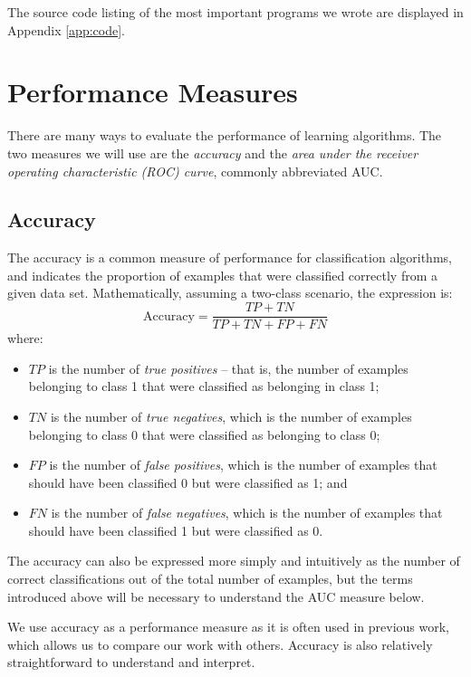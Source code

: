 The source code listing of the most important programs we wrote are displayed
in Appendix \ref{app:code}.

\section{Performance Measures}
There are many ways to evaluate the performance of learning algorithms. The
two measures we will use are the \textit{accuracy} and the \textit{area under
the receiver operating characteristic (ROC) curve}, commonly abbreviated AUC.

\subsection{Accuracy}
The accuracy is a common measure of performance for classification algorithms,
and indicates the proportion of examples that were classified correctly from
a given data set. Mathematically, assuming a two-class scenario, the expression
is:
\begin{equation*}
\mathrm{Accuracy} = \dfrac{TP + TN}{TP + TN + FP + FN}
\end{equation*}
where:
\begin{itemize}
  \item $TP$ is the number of \textit{true positives} -- that is, the number of
  examples belonging to class 1 that were classified as belonging in class 1;
  \item $TN$ is the number of \textit{true negatives}, which is the number of
  examples belonging to class 0 that were classified as belonging to class 0;
  \item $FP$ is the number of \textit{false positives}, which is the number of
  examples that should have been classified 0 but were classified as 1; and
  \item $FN$ is the number of \textit{false negatives}, which is the number of
  examples that should have been classified 1 but were classified as 0.
\end{itemize}

The accuracy can also be expressed more simply and intuitively as
the number of correct classifications out of the total number of examples,
but the terms introduced above will be necessary to understand the
AUC measure below.

We use accuracy as a performance measure as it is often used in previous work,
which allows us to compare our work with others. Accuracy is also relatively
straightforward to understand and interpret.


